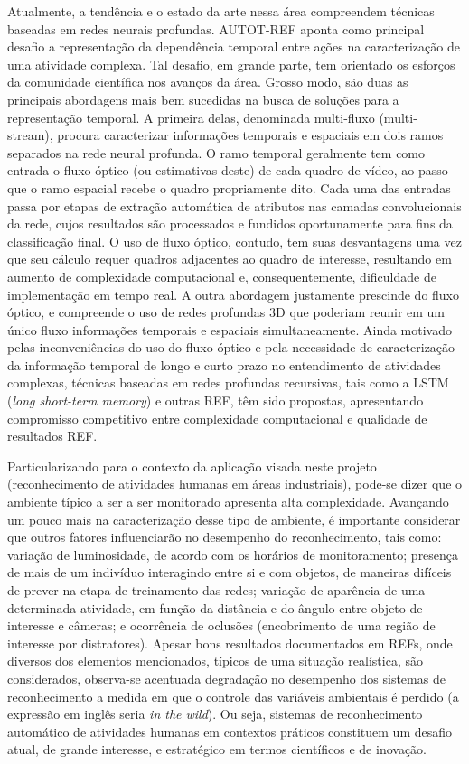 Atualmente, a tendência e o estado da arte nessa área compreendem técnicas baseadas em redes neurais profundas. AUTOT-REF aponta como principal desafio a representação da dependência temporal entre ações na caracterização de uma atividade complexa. Tal desafio, em grande parte, tem orientado os esforços da comunidade científica nos avanços da área. 
%
Grosso modo, são duas as principais abordagens mais bem sucedidas na busca de soluções para a representação temporal. A primeira delas, denominada multi-fluxo (multi-stream), procura caracterizar informações temporais e espaciais em dois ramos separados na rede neural profunda. O ramo temporal geralmente tem como entrada o fluxo óptico (ou estimativas deste) de cada quadro de vídeo, ao passo que o ramo espacial recebe o quadro propriamente dito. Cada uma das entradas passa por etapas de extração automática de atributos nas camadas convolucionais da rede, cujos resultados são processados e fundidos oportunamente para fins da classificação final. O uso de fluxo óptico, contudo, tem suas desvantagens uma vez que seu cálculo requer quadros adjacentes ao quadro de interesse, resultando em aumento de complexidade computacional e, consequentemente, dificuldade de implementação em tempo real. A outra abordagem justamente prescinde do fluxo óptico, e compreende o uso de redes profundas 3D que poderiam reunir em um único fluxo informações temporais e espaciais simultaneamente. 
%
Ainda motivado pelas inconveniências do uso do fluxo óptico e pela necessidade de caracterização da informação temporal de longo e curto prazo no entendimento de atividades complexas, técnicas baseadas em redes profundas recursivas, tais como a LSTM (\emph{long short-term memory}) e outras REF, têm sido propostas, apresentando compromisso competitivo entre complexidade computacional e qualidade de resultados REF.

Particularizando para o contexto da aplicação visada neste projeto (reconhecimento de atividades humanas em áreas industriais), pode-se dizer que o ambiente típico a ser a ser monitorado apresenta alta complexidade. Avançando um pouco mais na caracterização desse tipo de ambiente, é importante considerar que outros fatores influenciarão no desempenho do reconhecimento, tais como: variação de luminosidade, de acordo com os horários de monitoramento; presença de mais de um indivíduo interagindo entre si e com objetos, de maneiras difíceis de prever na etapa de treinamento das redes; variação de aparência de uma determinada atividade, em função da distância e do ângulo entre objeto de interesse e câmeras; e ocorrência de oclusões (encobrimento de uma região de interesse por distratores).
%
Apesar bons resultados documentados em REFs, onde diversos dos elementos mencionados, típicos de uma situação realística, são considerados, observa-se acentuada degradação no desempenho dos sistemas de reconhecimento a medida em que o controle das variáveis ambientais é perdido (a expressão em inglês seria \emph{in the wild}). Ou seja, sistemas de reconhecimento automático de atividades humanas em contextos práticos constituem um desafio atual, de grande interesse, e estratégico em termos científicos e de inovação.

